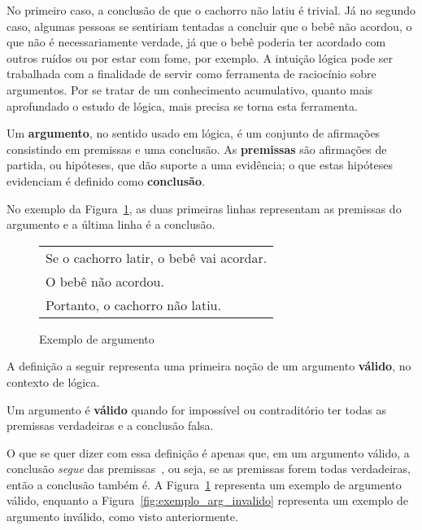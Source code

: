No primeiro caso, a conclusão de que o cachorro não latiu é trivial. Já no
segundo caso, algumas pessoas se sentiriam tentadas a concluir que o bebê não
acordou, o que não é necessariamente verdade, já que o bebê poderia ter acordado
com outros ruídos ou por estar com fome, por exemplo. A intuição lógica pode ser
trabalhada com a finalidade de servir como ferramenta de raciocínio sobre
argumentos. Por se tratar de um conhecimento acumulativo, quanto mais
aprofundado o estudo de lógica, mais precisa se torna esta ferramenta.

\begin{definition}
   Um \textbf{argumento}, no sentido usado em lógica, é um conjunto de
   afirmações consistindo em premissas e uma conclusão. As \textbf{premissas}
   são afirmações de partida, ou hipóteses, que dão suporte a uma evidência; o
   que estas hipóteses evidenciam é definido como \textbf{conclusão}.
\end{definition}

No exemplo da Figura~\ref{fig:exemplo_arg}, as duas primeiras linhas representam
as premissas do argumento e a última linha é a conclusão.

\begin{figure}[!tbh]
\label{fig:exemplo_arg}
\begin{center}
        \begin{tabular}{|l|}
            \hline
            Se o cachorro latir, o bebê vai acordar. \\
            O bebê não acordou.\\
            Portanto, o cachorro não latiu.\\
            \hline
        \end{tabular}
\end{center}
    \caption{Exemplo de argumento}
\end{figure}

A definição a seguir representa uma primeira noção de um argumento
\textbf{válido}, no contexto de lógica.

\begin{definition}
   Um argumento é \textbf{válido} quando for impossível ou contraditório ter
   todas as premissas verdadeiras e a conclusão falsa.
\end{definition}

O que se quer dizer com essa definição é apenas que, em um argumento válido, a
conclusão \textit{segue} das premissas~\cite{gensler}, ou seja, se as premissas
forem todas verdadeiras, então a conclusão também é.
A Figura~\ref{fig:exemplo_arg} representa um exemplo de argumento válido,
enquanto a Figura~\ref{fig:exemplo_arg_invalido} representa um exemplo de
argumento inválido, como visto anteriormente.


